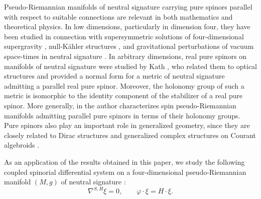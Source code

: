 \documentclass[10pt,reqno]{amsart}
\theoremstyle{definition}
\theoremstyle{remark}
\begin{document}
Pseudo-Riemannian manifolds of neutral signature carrying pure spinors parallel with respect to suitable connections are relevant in both mathematics and theoretical physics. In low dimensions, particularly in dimension four, they have been studied in connection with supersymmetric solutions of four-dimensional supergravity \cite{Gutowski_Sabra2019,Gutowski_Sabra2020,Klemm_Nozawa_2015}, null-Kähler structures \cite{Bryant2000,Dunajski2002,Dunajski_Przanowski2006}, and gravitational perturbations of vacuum space-times in neutral signature \cite{Araneda2023}. In arbitrary dimensions, real pure spinors on manifolds of neutral signature were studied by Kath \cite{Kath_2000,KathHabilitation}, who related them to optical structures and provided a normal form for a metric of neutral signature admitting a parallel real pure spinor. Moreover, the holonomy group of such a metric is isomorphic to the identity component of the stabilizer of a real pure spinor. More generally, in \cite{Ikemakhen2003} the author characterizes spin pseudo-Riemannian manifolds admitting parallel pure spinors in terms of their holonomy groups. Pure spinors also play an important role in generalized geometry, since they are closely related to Dirac structures and generalized complex structures on Courant algebroids \cite{Gualtieri2011,Cortes_David2021,GarciaFernandez_Streets2021}.\medskip

As an application of the results obtained in this paper, we study the following coupled spinorial differential system on a four-dimensional pseudo-Riemannian manifold $(M,g)$ of neutral signature \cite{Cortes_Lazaroiu_Shahbazi2021,ShahbaziThesis}: \begin{equation}\label{eq:KSE}
    \nabla^{S,H}\xi=0,\qquad\varphi\cdot\xi=H\cdot\xi.
\end{equation}
\end{document}
